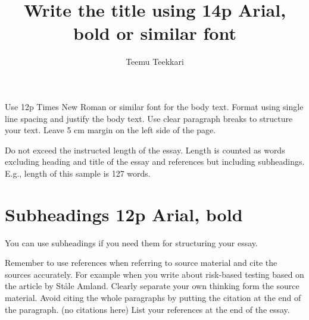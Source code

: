 \documentclass[12pt, a4paper]{article}
\title{Write the title using 14p Arial, bold or similar font}
\author{Teemu Teekkari}
\begin{document}
\maketitle

Use 12p Times New Roman or similar font for the body text. Format using single line spacing and justify the body text. 
Use clear paragraph breaks to structure your text. 
Leave 5 cm margin on the left side of the page.

Do not exceed the instructed length of the essay. Length is counted as words excluding heading and title of the essay and references but including subheadings. E.g., length of this sample is 127 words.

\section*{Subheadings 12p Arial, bold}

You can use subheadings if you need them for structuring your essay.

Remember to use references when referring to source material and cite the sources accurately. For example when you write about risk-based testing \autocite{amland2000risk} based on the article by Ståle Amland. Clearly separate your own thinking form the source material. Avoid citing the whole paragraphs by putting the citation at the end of the paragraph. (no citations here)
List your references at the end of the essay.

\printbibliography
\end{document}
